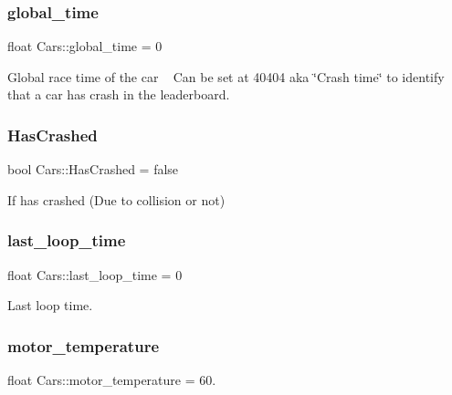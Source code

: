 \subsubsection{\texorpdfstring{global\+\_\+time}{global\_time}}
{\footnotesize\ttfamily float Cars\+::global\+\_\+time = 0}



Global race time of the car ~\newline
 Can be set at 40404 aka \char`\"{}\+Crash time\char`\"{} to identify that a car has crash in the leaderboard. 

\mbox{\label{class_cars_a92c95cf39dbdf1b65814b74d74ccfc5a}} 
\subsubsection{\texorpdfstring{Has\+Crashed}{HasCrashed}}
{\footnotesize\ttfamily bool Cars\+::\+Has\+Crashed = false}



If has crashed (Due to collision or not) 

\mbox{\label{class_cars_ae635953be902a0d9bc66ca6cb3145b14}} 
\subsubsection{\texorpdfstring{last\+\_\+loop\+\_\+time}{last\_loop\_time}}
{\footnotesize\ttfamily float Cars\+::last\+\_\+loop\+\_\+time = 0}



Last loop time. 

\mbox{\label{class_cars_afb6db39831b1b143d496405ddb3e0807}} 
\subsubsection{\texorpdfstring{motor\+\_\+temperature}{motor\_temperature}}
{\footnotesize\ttfamily float Cars\+::motor\+\_\+temperature = 60.}



